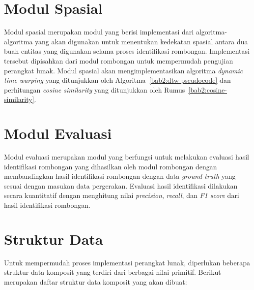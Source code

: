 \section{Modul Spasial}
\label{sec:des-spatial}

Modul spasial merupakan modul yang berisi implementasi dari algoritma-algoritma yang akan digunakan untuk menentukan kedekatan spasial antara dua buah entitas yang digunakan selama proses identifikasi rombongan. Implementasi tersebut dipisahkan dari modul rombongan untuk mempermudah pengujian perangkat lunak. Modul spasial akan mengimplementasikan algoritma \textit{dynamic time warping} yang ditunjukkan oleh Algoritma~\ref{bab2:dtw-pseudocode} dan perhitungan \textit{cosine similarity} yang ditunjukkan oleh Rumus~\ref{bab2:cosine-similarity}.

\section{Modul Evaluasi}
\label{sec:des-evaluation}

Modul evaluasi merupakan modul yang berfungsi untuk melakukan evaluasi hasil identifikasi rombongan yang dihasilkan oleh modul rombongan dengan membandingkan hasil identifikasi rombongan dengan data \textit{ground truth} yang sesuai dengan masukan data pergerakan. Evaluasi hasil identifikasi dilakukan secara kuantitatif dengan menghitung nilai \textit{precision}, \textit{recall}, dan \textit{F1 score} dari hasil identifikasi rombongan.

\section{Struktur Data}
\label{sec:des-struct}

Untuk mempermudah proses implementasi perangkat lunak, diperlukan beberapa struktur data komposit yang terdiri dari berbagai nilai primitif. Berikut merupakan daftar struktur data komposit yang akan dibuat:

